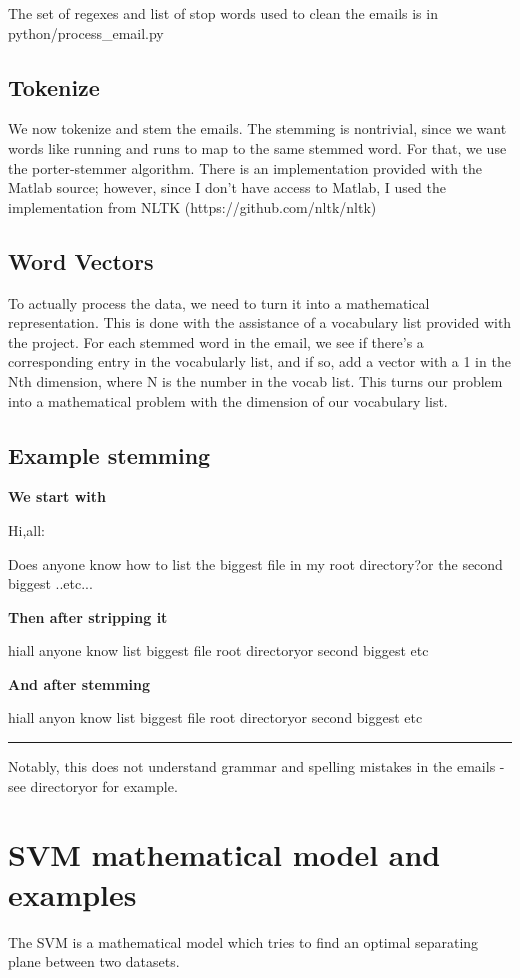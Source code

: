 \documentclass[]{article}
\begin{document}
The set of regexes and list of stop words used to clean the emails is in python/process\_email.py

\subsection{Tokenize}

We now tokenize and stem the emails. The stemming is nontrivial, since we want words like running and runs to map to the same stemmed word. For that, we use the porter-stemmer algorithm. There is an implementation provided with the Matlab source; however, since I don't have access to Matlab, I used the implementation from NLTK (https://github.com/nltk/nltk)

\subsection{Word Vectors}

To actually process the data, we need to turn it into a mathematical representation. This is done with the assistance of a vocabulary list provided with the project. For each stemmed word in the email, we see if there's a corresponding entry in the vocabularly list, and if so, add a vector with a 1 in the Nth dimension, where N is the number in the vocab list. This turns our problem into a mathematical problem with the dimension of our vocabulary list.

\subsection{Example stemming}

\textbf{We start with}

Hi,all:

Does anyone know how to list the biggest file in my
root directory?or the second biggest ..etc...

\textbf{Then after stripping it}

hiall anyone know list biggest file root directoryor second biggest etc

\textbf{And after stemming}

hiall anyon know list biggest file root directoryor second biggest etc

\noindent\rule[0.5ex]{\linewidth}{1pt}

Notably, this does not understand grammar and spelling mistakes in the emails - see directoryor for example.

\section{SVM mathematical model and examples}
The SVM is a mathematical model which tries to find an optimal separating plane between two datasets.
\end{document}

